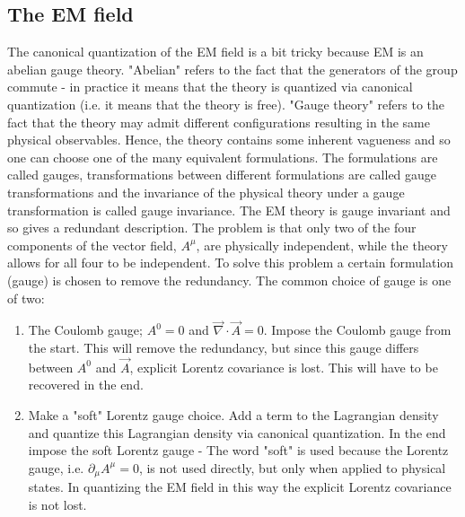 \subsection*{The EM field}
The canonical quantization of the EM field is a bit tricky because EM is an abelian gauge theory. "Abelian" refers to the fact that the generators of the group commute - in practice it means that the theory is quantized via canonical quantization (i.e. it means that the theory is free). "Gauge theory" refers to the fact that the theory may admit different configurations resulting in the same physical observables. Hence, the theory contains some inherent vagueness and so one can choose one of the many equivalent formulations. The formulations are called gauges, transformations between different formulations are called gauge transformations and the invariance of the physical theory under a gauge transformation is called gauge invariance. 
The EM theory is gauge invariant and so gives a redundant description. The problem is that only two of the four components of the vector field, $A^\mu$, are physically independent, while the theory allows for all four to be independent. To solve this problem a certain formulation (gauge) is chosen to remove the redundancy. The common choice of gauge is one of two:
\begin{enumerate}
	\item The Coulomb gauge; $A^0=0$ and $\vec{\nabla}\cdot\vec{A}=0$.\newline
	Impose the Coulomb gauge from the start. This will remove the redundancy, but since this gauge differs between $A^0$ and $\vec{A}$, explicit Lorentz covariance is lost. This will have to be recovered in the end.
	
	\item Make a "soft" Lorentz gauge choice.\newline
	Add a term to the Lagrangian density and quantize this Lagrangian density via canonical quantization. In the end impose the soft Lorentz gauge - The word "soft" is used because the Lorentz gauge, i.e. $\partial_\mu A^\mu=0$, is not used directly, but only when applied to physical states. In quantizing the EM field in this way the explicit Lorentz covariance is not lost. 
\end{enumerate}

